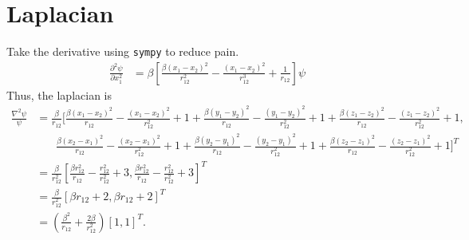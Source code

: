 \section{Laplacian}
Take the derivative using \texttt{sympy} to reduce pain.
\begin{align}
\frac{\partial^2 \psi}{\partial x_1^2} &= \beta \left[\frac{\beta(x_1 - x_2)^2}{r_{12}^2} - \frac{(x_1 - x_2)^2}{r_{12}^3} + \frac{1}{r_{12}}\right] \psi
\end{align}
Thus, the laplacian is
\begin{align}
\frac{\nabla^2 \psi}{\psi} &= \frac{\beta}{r_{12}} 
\biggl[
\frac{\beta(x_1 - x_2)^2}{r_{12}} - \frac{(x_1 - x_2)^2}{r_{12}^2} + 1 + 
\frac{\beta(y_1 - y_2)^2}{r_{12}} - \frac{(y_1 - y_2)^2}{r_{12}^2} + 1 + 
\frac{\beta(z_1 - z_2)^2}{r_{12}} - \frac{(z_1 - z_2)^2}{r_{12}^2} + 1, \\
&~~~~~~~~\frac{\beta(x_2 - x_1)^2}{r_{12}} - \frac{(x_2 - x_1)^2}{r_{12}^2} + 1 + 
\frac{\beta(y_2 - y_1)^2}{r_{12}} - \frac{(y_2 - y_1)^2}{r_{12}^2} + 1 + 
\frac{\beta(z_2 - z_1)^2}{r_{12}} - \frac{(z_2 - z_1)^2}{r_{12}^2} + 1
\biggr]^T \\
&= \frac{\beta}{r_{12}^2} 
\left[
\frac{\beta r_{12}^2}{r_{12}} - \frac{r_{12}^2}{r_{12}^2} + 3, 
\frac{\beta r_{12}^2}{r_{12}} - \frac{r_{12}^2}{r_{12}^2} + 3
\right]^T \\
&= \frac{\beta}{r_{12}^2} [\beta r_{12} + 2, \beta r_{12} + 2]^T \\
&= \boxed{\left(\frac{\beta^2}{r_{12}} + \frac{2 \beta}{r_{12}^2} \right) [1, 1]^T}.
\end{align}
